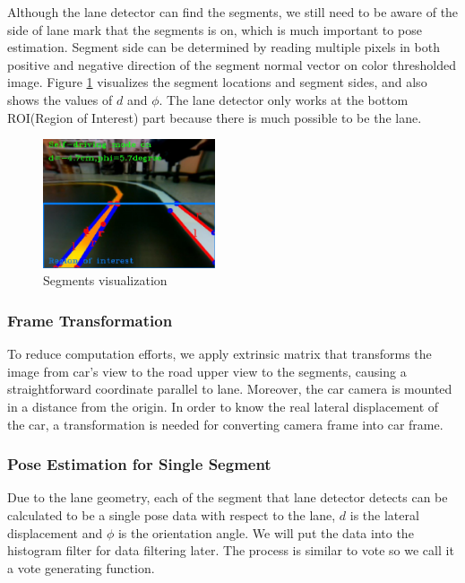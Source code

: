 \documentclass[conference]{IEEEtran}
\begin{document}
Although the lane detector can find the segments, we still need to be aware of the side of lane mark that the segments is on, which is much important to pose estimation. Segment side can be determined by reading multiple pixels in both positive and negative direction of the segment normal vector on color thresholded image. Figure \ref{fig:lane_detect} visualizes the segment locations and segment sides, and also shows the values of $d$ and $\phi$. The lane detector only works at the bottom ROI(Region of Interest) part because there is much possible to be the lane.

\begin{figure}
	\centering
	\includegraphics[width=2in]{img/lane_detect.png}
	\caption{Segments visualization}
	\label{fig:lane_detect}
\end{figure}

\subsubsection{Frame Transformation}

To reduce computation efforts, we apply extrinsic matrix that transforms the image from car's view to the road upper view to the segments, causing a straightforward coordinate parallel to lane. Moreover, the car camera is mounted in a distance from the origin. In order to know the real lateral displacement of the car, a transformation is needed for converting camera frame into car frame.

\subsubsection{Pose Estimation for Single Segment}

Due to the lane geometry, each of the segment that lane detector detects can be calculated to be a single pose data with respect to the lane, $d$ is the lateral displacement and $\phi$ is the orientation angle. We will put the data into the histogram filter for data filtering later. The process is similar to vote so we call it a vote generating function.
\end{document}
